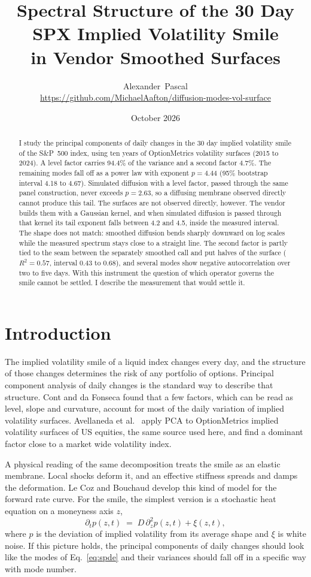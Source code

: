 \documentclass[11pt]{article}
\title{\textbf{Spectral Structure of the 30 Day SPX Implied Volatility Smile\\ in Vendor Smoothed Surfaces}}
\author{Alexander~Pascal\\ \small\url{https://github.com/MichaelAafton/diffusion-modes-vol-surface}}
\date{October 2026}
\begin{document}
\maketitle

\begin{abstract}
\noindent I study the principal components of daily changes in the 30 day implied volatility smile of the S\&P~500 index, using ten years of OptionMetrics volatility surfaces (2015 to 2024). A level factor carries 94.4\% of the variance and a second factor 4.7\%. The remaining modes fall off as a power law with exponent $p=4.44$ (95\% bootstrap interval 4.18 to 4.67). Simulated diffusion with a level factor, passed through the same panel construction, never exceeds $p=2.63$, so a diffusing membrane observed directly cannot produce this tail. The surfaces are not observed directly, however. The vendor builds them with a Gaussian kernel, and when simulated diffusion is passed through that kernel its tail exponent falls between 4.2 and 4.5, inside the measured interval. The shape does not match: smoothed diffusion bends sharply downward on log scales while the measured spectrum stays close to a straight line. The second factor is partly tied to the seam between the separately smoothed call and put halves of the surface ($R^2=0.57$, interval 0.43 to 0.68), and several modes show negative autocorrelation over two to five days. With this instrument the question of which operator governs the smile cannot be settled. I describe the measurement that would settle it.
\end{abstract}

\section{Introduction}

The implied volatility smile of a liquid index changes every day, and the structure of those changes determines the risk of any portfolio of options. Principal component analysis of daily changes is the standard way to describe that structure. Cont and da Fonseca \cite{cont} found that a few factors, which can be read as level, slope and curvature, account for most of the daily variation of implied volatility surfaces. Avellaneda et al.\ \cite{avellaneda} apply PCA to OptionMetrics implied volatility surfaces of US equities, the same source used here, and find a dominant factor close to a market wide volatility index.

A physical reading of the same decomposition treats the smile as an elastic membrane. Local shocks deform it, and an effective stiffness spreads and damps the deformation. Le Coz and Bouchaud \cite{lecoz} develop this kind of model for the forward rate curve. For the smile, the simplest version is a stochastic heat equation on a moneyness axis $z$,
\begin{equation}
\partial_t p(z,t) \;=\; D\,\partial_z^2 p(z,t) + \xi(z,t),
\label{eq:spde}
\end{equation}
where $p$ is the deviation of implied volatility from its average shape and $\xi$ is white noise. If this picture holds, the principal components of daily changes should look like the modes of Eq.~\eqref{eq:spde} and their variances should fall off in a specific way with mode number.
\end{document}
